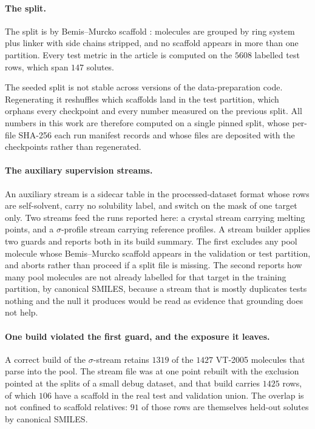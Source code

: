 \paragraph{The split.}
The split is by Bemis--Murcko scaffold \cite{bemis1996}: molecules are grouped by ring system plus
linker with side chains stripped, and no scaffold appears in more than one partition. Every test
metric in the article is computed on the $5608$ labelled test rows, which span $147$ solutes.

The seeded split is not stable across versions of the data-preparation code. Regenerating it
reshuffles which scaffolds land in the test partition, which orphans every checkpoint and every
number measured on the previous split. All numbers in this work are therefore computed on a single
pinned split, whose per-file SHA-256 each run manifest records and whose files are deposited with
the checkpoints rather than regenerated.

\paragraph{The auxiliary supervision streams.}
An auxiliary stream is a sidecar table in the processed-dataset format whose rows are
self-solvent, carry no solubility label, and switch on the mask of one target only. Two streams
feed the runs reported here: a crystal stream carrying melting points, and a $\sigma$-profile
stream carrying reference profiles. A stream builder applies two guards and reports both in its
build summary. The first excludes any pool molecule whose Bemis--Murcko scaffold appears in the
validation or test partition, and aborts rather than proceed if a split file is missing. The second
reports how many pool molecules are not already labelled for that target in the training partition,
by canonical SMILES, because a stream that is mostly duplicates tests nothing and the null it
produces would be read as evidence that grounding does not help.

\paragraph{One build violated the first guard, and the exposure it leaves.}
A correct build of the $\sigma$-stream retains $1319$ of the $1427$ VT-2005 molecules that parse
into the pool. The stream file was at one point rebuilt with the exclusion pointed at the splits of
a small debug dataset, and that build carries $1425$ rows, of which $106$ have a scaffold in the
real test and validation union. The overlap is not confined to scaffold relatives: $91$ of those
rows are themselves held-out solutes by canonical SMILES.

